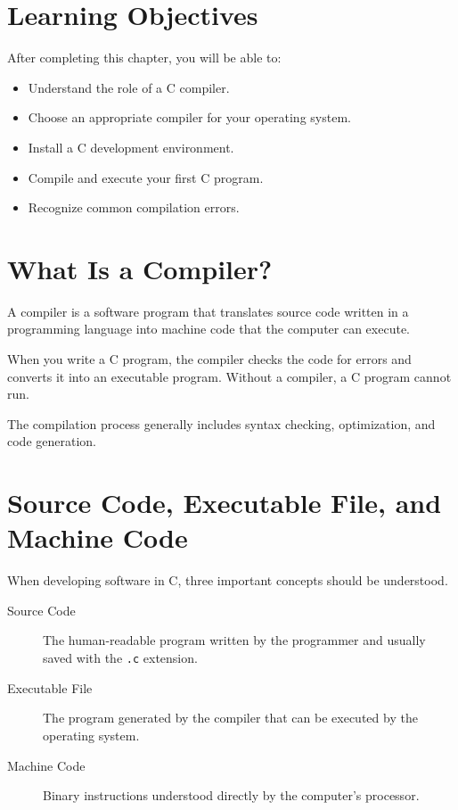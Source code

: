 \documentclass[12pt,openany]{book}
\begin{document}
\section{Learning Objectives}

After completing this chapter, you will be able to:

\begin{itemize}
    \item Understand the role of a C compiler.
    \item Choose an appropriate compiler for your operating system.
    \item Install a C development environment.
    \item Compile and execute your first C program.
    \item Recognize common compilation errors.
\end{itemize}

\section{What Is a Compiler?}

A compiler is a software program that translates source code written in a programming language into machine code that the computer can execute.

When you write a C program, the compiler checks the code for errors and converts it into an executable program. Without a compiler, a C program cannot run.

The compilation process generally includes syntax checking, optimization, and code generation.

\section{Source Code, Executable File, and Machine Code}

When developing software in C, three important concepts should be understood.

\begin{description}
    \item[Source Code] The human-readable program written by the programmer and usually saved with the \texttt{.c} extension.
    \item[Executable File] The program generated by the compiler that can be executed by the operating system.
    \item[Machine Code] Binary instructions understood directly by the computer's processor.
\end{description}
\end{document}
